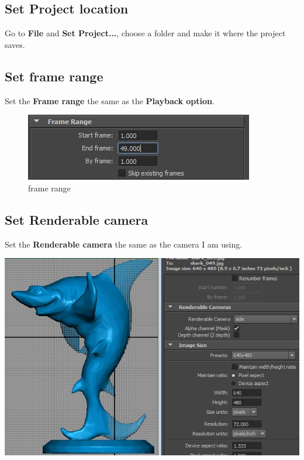 \documentclass[10pt,a4paper]{article}
\begin{document}
\subsection{Set Project location}
Go to \textbf{File} and \textbf{Set Project...}, choose a folder and make it where the project saves.

\subsection{Set frame range}
Set the \textbf{Frame range} the same as the \textbf{Playback option}.

\begin{figure}[h]
\centering
\includegraphics[scale=0.5]{frameRange}
\caption{frame range}
\label{fig:frameRange}
\end{figure}

\subsection{Set Renderable camera}
Set the \textbf{Renderable camera} the same as the camera I am using.
\begin{center}
\includegraphics[scale=0.4]{renderableCamera}
\label{fig:renderableCamera}
\end{center}
\end{document}
